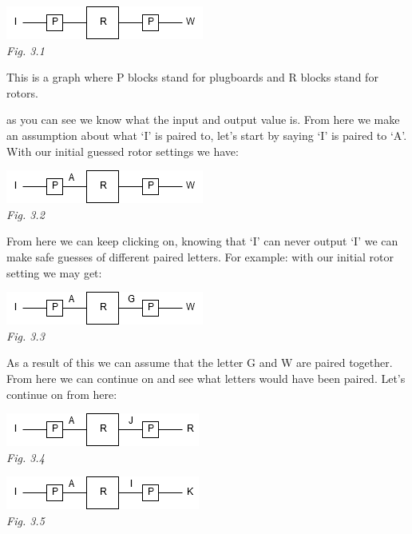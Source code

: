 \documentclass[11pt]{article}
\newcommand\tab[1][0.5cm]{\hspace*{#1}}
\begin{document}
\begin{center}
	\includegraphics[scale=1]{photos/Enigma1.png}\\
	\textit{Fig. 3.1}
\end{center}

\tab This is a graph where P blocks stand for plugboards and R blocks stand for rotors. 

\tab as you can see we know what the input and output value is. From here we make an assumption about what `I' is paired to, let's start by saying `I' is paired to `A'. With our initial guessed rotor settings we have:

\begin{center}
	\includegraphics[scale=1]{photos/Enigma2.png}\\
	\textit{Fig. 3.2}
\end{center}

\tab From here we can keep clicking on, knowing that `I' can never output `I' we can make safe guesses of different paired letters. For example: with our initial rotor setting we may get:

\begin{center}
	\includegraphics[scale=1]{photos/Enigma3.png}\\
	\textit{Fig. 3.3}
\end{center}

\tab As a result of this we can assume that the letter G and W are paired together. From here we can continue on and see what letters would have been paired. Let's continue on from here:

\begin{center}
	\includegraphics[scale=1]{photos/Enigma4.png} \\
	\textit{Fig. 3.4}
\end{center}
\begin{center}
	\includegraphics[scale=1]{photos/Enigma5.png} \\
	\textit{Fig. 3.5}
\end{center}
\end{document}

